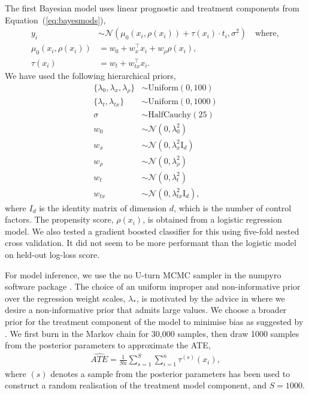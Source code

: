 \documentclass[12pt, a4paper]{article}
\begin{document}
The first Bayesian model uses linear prognostic and treatment components 
from Equation~(\ref{eq:bayesmods}),
\begin{align*}
y_i &\sim \mathcal{N}\!\left(
  \mu_0(x_i, \rho(x_i)) + \tau(x_i)\cdot t_i, 
  \sigma^2\right) 
  \quad\textrm{where}, \\
\mu_0(x_i, \rho(x_i)) &= w_0 + w_x^\top x_i + w_\rho \rho(x_i), \\
\tau(x_i) &= w_t + w_{tx}^\top x_i.
\end{align*}
We have used the following hierarchical priors,
\begin{align*}
  \{\lambda_0, \lambda_x, \lambda_\rho\} &\sim \textrm{Uniform}(0, 100) \\
  \{\lambda_t, \lambda_{tx}\} &\sim \textrm{Uniform}(0, 1000) \\
  \sigma &\sim \textrm{HalfCauchy}(25) \\
  w_0 &\sim \mathcal{N}(0,\lambda_0^2) \\
  w_x &\sim \mathcal{N}(0,\lambda_x^2 \textrm{I}_d) \\
  w_\rho &\sim \mathcal{N}(0,\lambda_\rho^2) \\
  w_t &\sim \mathcal{N}(0,\lambda_t^2) \\
  w_{tx} &\sim \mathcal{N}(0,\lambda^2_{tx} \textrm{I}_d),
\end{align*}
where $I_d$ is the identity matrix of dimension $d$, which is the number of
control factors. The propensity score, $\rho(x_i)$, is obtained from a logistic
regression model. We also tested a gradient boosted classifier
\citep{friedman2001} for this using five-fold nested cross validation.  It did
not seem to be more performant than the logistic model on held-out log-loss
score.

For model inference, we use the no U-turn MCMC sampler \citep{hoffman2014} in
the numpyro software package \citep{bingham2019, phan2019}. The choice of an
uniform improper and non-informative prior over the regression weight scales,
$\lambda_*$, is motivated by the advice in \citet{gelman2006} where we desire a
non-informative prior that admits large values. We choose a broader 
prior for the treatment component of the model to minimise bias as suggested by
\cite{hahn2020}. We first burn in the Markov chain for 30,000 samples, then draw
1000 samples from the posterior parameters to approximate the ATE,
\begin{align}
  \hat{ATE} = \frac{1}{Sn} \sum^S_{s=1} \sum^n_{i=1} \tau^{(s)}(x_i),
  \label{eq:bayesATE}
\end{align}
where $(s)$ denotes a sample from the posterior parameters has been used to 
construct a random realisation of the treatment model component, and $S = 1000$.
\end{document}
